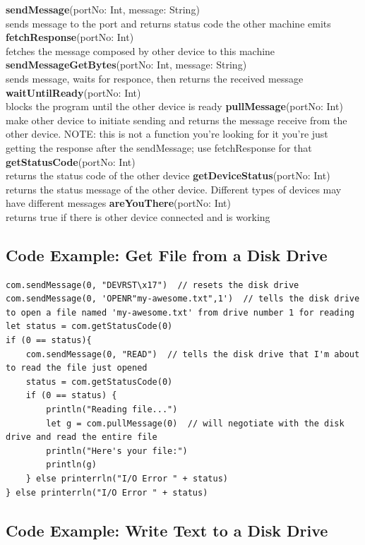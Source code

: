 \begin{outline}
\1\textbf{sendMessage}(portNo: Int, message: String)
\\sends message to the port and returns status code the other machine emits
\1\textbf{fetchResponse}(portNo: Int)
\\fetches the message composed by other device to this machine
\1\textbf{sendMessageGetBytes}(portNo: Int, message: String)
\\sends message, waits for responce, then returns the received message
\1\textbf{waitUntilReady}(portNo: Int)
\\blocks the program until the other device is ready
\1\textbf{pullMessage}(portNo: Int)
\\make other device to initiate sending and returns the message receive from the other device. NOTE: this is not a function you're looking for it you're just getting the response after the sendMessage; use fetchResponse for that
\1\textbf{getStatusCode}(portNo: Int)
\\returns the status code of the other device
\1\textbf{getDeviceStatus}(portNo: Int)
\\returns the status message of the other device. Different types of devices may have different messages
\1\textbf{areYouThere}(portNo: Int)
\\returns true if there is other device connected and is working
\end{outline}


\subsection{Code Example: Get File from a Disk Drive}

\begin{lstlisting}
com.sendMessage(0, "DEVRST\x17")  // resets the disk drive
com.sendMessage(0, 'OPENR"my-awesome.txt",1')  // tells the disk drive to open a file named 'my-awesome.txt' from drive number 1 for reading
let status = com.getStatusCode(0)
if (0 == status){
	com.sendMessage(0, "READ")  // tells the disk drive that I'm about to read the file just opened
	status = com.getStatusCode(0)
	if (0 == status) {
		println("Reading file...")
		let g = com.pullMessage(0)  // will negotiate with the disk drive and read the entire file
		println("Here's your file:")
		println(g)
	} else printerrln("I/O Error " + status)
} else printerrln("I/O Error " + status)
\end{lstlisting}


\subsection{Code Example: Write Text to a Disk Drive}

